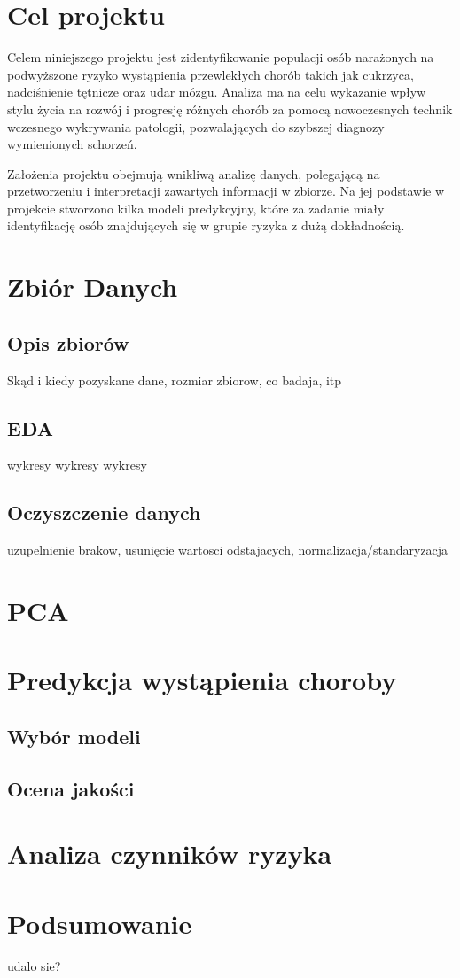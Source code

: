 \documentclass[onecolumn,12pt]{article}
\begin{document}
\section{Cel projektu}

Celem niniejszego projektu jest zidentyfikowanie populacji osób narażonych na podwyższone ryzyko
wystąpienia przewlekłych chorób takich jak cukrzyca, nadciśnienie tętnicze oraz udar mózgu. Analiza ma na celu wykazanie wpływ stylu życia na rozwój i progresję różnych chorób za pomocą nowoczesnych technik wczesnego wykrywania patologii, pozwalających do szybszej diagnozy wymienionych schorzeń.

Założenia projektu obejmują wnikliwą analizę danych, polegającą na przetworzeniu i interpretacji zawartych informacji w zbiorze. Na jej podstawie w projekcie stworzono kilka modeli predykcyjny, które za zadanie miały identyfikację osób znajdujących się w grupie ryzyka z dużą dokładnością.
        
\section{Zbiór Danych}

\subsection{Opis zbiorów}
Skąd i kiedy pozyskane dane, rozmiar zbiorow, co badaja, itp
\subsection{EDA}
wykresy wykresy wykresy
\subsection{Oczyszczenie danych}
uzupelnienie brakow, usunięcie wartosci odstajacych, normalizacja/standaryzacja 

\section{PCA}

\section{Predykcja wystąpienia choroby}
\subsection{Wybór modeli}
\subsection{Ocena jakości}

\section{Analiza czynników ryzyka}

\section{Podsumowanie}
udalo sie? 

\begin{thebibliography}{9}
\end{thebibliography}
\end{document}
